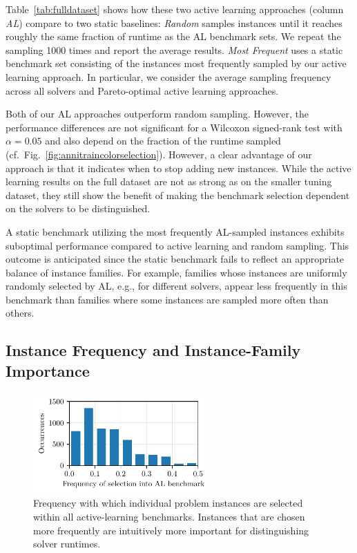 \documentclass[sn-basic, Numbered]{sn-jnl} %
\begin{document}
Table~\ref{tab:fulldataset} shows how these two active learning approaches (column \emph{AL}) compare to two static baselines:
\emph{Random} samples instances until it reaches roughly the same fraction of runtime as the AL benchmark sets.
We repeat the sampling 1000 times and report the average results.
\emph{Most Frequent} uses a static benchmark set consisting of the instances most frequently sampled by our active learning approach.
In particular, we consider the average sampling frequency across all solvers and Pareto-optimal active learning approaches.

Both of our AL approaches outperform random sampling.
However, the performance differences are not significant for a Wilcoxon signed-rank test with $\alpha = 0.05$ and also depend on the fraction of the runtime sampled (cf.~Fig.~\ref{fig:annitraincolorselection}).
However, a clear advantage of our approach is that it indicates when to stop adding new instances.
While the active learning results on the full dataset are not as strong as on the smaller tuning dataset, they still show the benefit of making the benchmark selection dependent on the solvers to be distinguished.

A static benchmark utilizing the most frequently AL-sampled instances exhibits suboptimal performance compared to active learning and random sampling.
This outcome is anticipated since the static benchmark fails to reflect an appropriate balance of instance families.
For example, families whose instances are uniformly randomly selected by AL, e.g., for different solvers, appear less frequently in this benchmark than families where some instances are sampled more often than others.

\subsection{Instance Frequency and Instance-Family Importance}
\label{sec:eval:instance}

\begin{figure}[tbp]
  \centering
  \includegraphics[width=0.6\textwidth]{../plots/instoccs.pdf}
  \caption{Frequency with which individual problem instances are selected within all active-learning benchmarks. Instances that are chosen more frequently are intuitively more important for distinguishing solver runtimes.}
  \label{fig:instoccs}
\end{figure}
\end{document}
